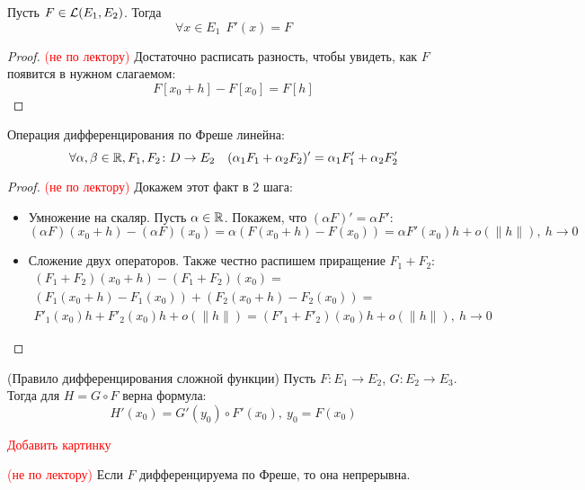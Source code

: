 \begin{proposition}
	Пусть $F \in \mathcal{L}(E_1, E_2)$. Тогда
	\[
		\forall x \in E_1\ \ F'(x) = F
	\]
\end{proposition}

\begin{proof} \textcolor{red}{(не по лектору)}
	Достаточно расписать разность, чтобы увидеть, как $F$ появится в нужном слагаемом:
	\[
		F[x_0 + h] - F[x_0] = F[h]
	\]
\end{proof}

\begin{proposition}
	Операция дифференцирования по Фреше линейна:
	\[
		\forall \alpha, \beta \in \mathbb{R}, F_1, F_2 \colon D \to E_2\ \ \ (\alpha_1F_1 + \alpha_2F_2)' = \alpha_1F'_1 + \alpha_2F'_2
	\]
\end{proposition}

\begin{proof} \textcolor{red}{(не по лектору)}
	Докажем этот факт в 2 шага:
	\begin{itemize}
		\item Умножение на скаляр. Пусть $\alpha \in \mathbb{R}$. Покажем, что $(\alpha F)' = \alpha F'$:
		\[
			(\alpha F)(x_0 + h) - (\alpha F)(x_0) = \alpha(F(x_0 + h) - F(x_0)) = \alpha F'(x_0) h + o(\|h\|),\ h \to 0
		\]
		
		\item Сложение двух операторов. Также честно распишем приращение $F_1 + F_2$:
		\begin{multline*}
			(F_1 + F_2)(x_0 + h) - (F_1 + F_2)(x_0) =
			\\
			(F_1(x_0 + h) - F_1(x_0)) + (F_2(x_0 + h) - F_2(x_0)) =
			\\
			F'_1(x_0)h + F'_2(x_0)h + o(\|h\|) = (F'_1 + F'_2)(x_0)h + o(\|h\|),\ h \to 0
		\end{multline*}
	\end{itemize}
\end{proof}

\begin{theorem} (Правило дифференцирования сложной функции)
	Пусть $F \colon E_1 \to E_2$, $G \colon E_2 \to E_3$. Тогда для $H = G \circ F$ верна формула:
	\[
		H'(x_0) = G'(y_0) \circ F'(x_0),\ y_0 = F(x_0)
	\]
\end{theorem}

\textcolor{red}{Добавить картинку}

\begin{proposition} \textcolor{red}{(не по лектору)}
	Если $F$ дифференцируема по Фреше, то она непрерывна.
\end{proposition}

